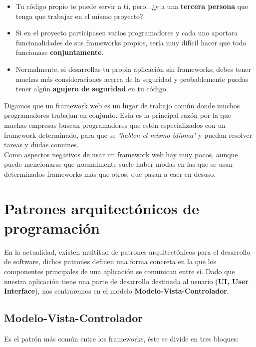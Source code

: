     \begin{itemize}
        \item Tu código propio te puede servir a ti, pero...¿y a una \textbf{tercera persona}
        que tenga que trabajar en el mismo proyecto?
        \item Si en el proyecto participasen varios programadores y cada uno aportara
        funcionalidades de sus frameworks propios, sería muy difícil hacer que todo
        funcionase \textbf{conjuntamente}.
        \item Normalmente, si desarrollas tu propia aplicación sin frameworks, debes
        tener muchas más consideraciones acerca de la seguridad y probablemente puedas
        tener algún \textbf{agujero de seguridad} en tu código.
    \end{itemize}

Digamos que un framework web es un lugar de trabajo común donde muchos programadores
trabajan en conjunto. Esta es la principal razón por la que muchas empresas buscan
programadores que estén especializados con un framework determinado, para que se
\textit{"hablen el mismo idioma"} y puedan resolver tareas y dudas comunes.\\

Como aspectos negativos de usar un framework web hay muy pocos, aunque puede mencionarse
que normalmente suele haber modas en las que se usan determinados frameworks más que otros,
que pasan a caer en desuso.\\


\section{Patrones arquitectónicos de programación} \label{sec:patrones-arquitectonicos}
En la actualidad, existen multitud de patrones arquitectónicos para el desarrollo de
software, dichos patrones definen una forma concreta en la que los componentes principales
de una aplicación se comunican entre sí. Dado que nuestra aplicación tiene una parte de
desarrollo destinada al usuario (\textbf{UI, User Interface}), nos centraremos en el modelo
\textbf{Modelo-Vista-Controlador}.

\subsection{Modelo-Vista-Controlador} \label{sec:mvc}
Es el patrón más común entre los frameworks, éste se divide en tres bloques:

